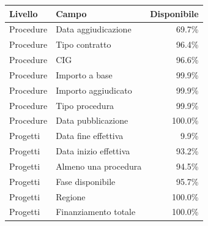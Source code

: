 \begin{tabular}{llr}
\toprule
Livello & Campo & Disponibile \\
\midrule
Procedure & Data aggiudicazione & 69.7\% \\
Procedure & Tipo contratto & 96.4\% \\
Procedure & CIG & 96.6\% \\
Procedure & Importo a base & 99.9\% \\
Procedure & Importo aggiudicato & 99.9\% \\
Procedure & Tipo procedura & 99.9\% \\
Procedure & Data pubblicazione & 100.0\% \\
Progetti & Data fine effettiva & 9.9\% \\
Progetti & Data inizio effettiva & 93.2\% \\
Progetti & Almeno una procedura & 94.5\% \\
Progetti & Fase disponibile & 95.7\% \\
Progetti & Regione & 100.0\% \\
Progetti & Finanziamento totale & 100.0\% \\
\bottomrule
\end{tabular}
